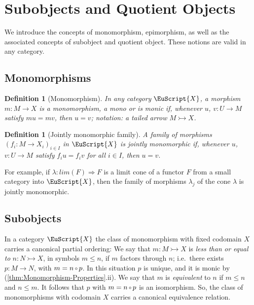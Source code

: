 \documentclass [12pt,oneside]{book}%
\theoremstyle{captionstyle}  %
\newtheorem{definition}[theorem]{Definition}
\newcommand{\IndSep}{\qquad}
\newcommand{\Defn}[1]{\emph{#1}}
\newcommand{\from}{\colon}				%
\newcommand{\Comp}{\raisebox{0.1ex}{\ensuremath{\,\scriptstyle{\circ}}\,}}
\newcommand{\Mono}{\rightarrowtail}			%
\newcommand{\Ctgry}[1]{\EuScript{#1}}					%
\newcommand{\SACtgry}[1]{\EuScript{#1}}			%
\newcommand{\LimOf}[1]{\textit{lim}\left(#1\right)}        			%
\begin{document}
\section{Subobjects and Quotient Objects}
\label{sec:SubObjects-QuotientObjects}

We introduce the concepts of monomorphism, epimorphism, as well as the associated concepts of subobject and quotient object. These notions are valid in any category.

\subsection*{Monomorphisms}

\begin{definition}[Monomorphism]
    \label{def:Monomorphism}
    In any category $\Ctgry{X}$, a morphism $m\from M\to X$ is a \Defn{monomorphism}, a \Defn{mono} or  \Defn{is monic} if, whenever $u$, $v\from {U\to M}$ satisfy $mu=mv$, then $u=v$; notation: a tailed arrow $M\Mono X$. %
    \index[not]{m!$X\Mono Y$\IndSep monomorphism}
\end{definition}

\begin{definition}[Jointly monomorphic family]
    \label{def:JointlyMonomorphicFamily}
    A family of morphisms $(f_i\from M\to X_i)_{i\in I}$ in $\SACtgry{X}$ is \Defn{jointly monomorphic} if, whenever $u$, $v\from {U\to M}$ satisfy $f_iu=f_iv$ for all $i\in I$, then $u=v$. %
\end{definition}

For example, if $\lambda\from \LimOf{F}\Rightarrow F$ is a limit cone of a functor $F$ from a small category into $\SACtgry{X}$, then the family of morphisms $\lambda_j$ of the cone $\lambda$ is jointly monomorphic.

\subsection*{Subobjects}
In a category $\SACtgry{X}$ the class of monomorphism with fixed codomain $X$ carries a canonical partial ordering: We say that $m\from M\Mono X$ is \Defn{less than or equal to} $n\from N\Mono X$, in symbols $m\leq n$, if $m$ factors through $n$; i.e.\ there exists $p\from {M\to N}$, with $m=n\Comp p$. In this situation $p$ is unique, and it is monic by (\ref{thm:Monomorphism-Properties}.ii). We say that $m$ is \Defn{equivalent} to $n$ if $m\leq n$ and $n\leq m$. It follows that $p$ with $m=n\Comp p$ is an isomorphism. So, the class of monomorphisms with codomain $X$ carries a canonical equivalence relation.
\end{document}
